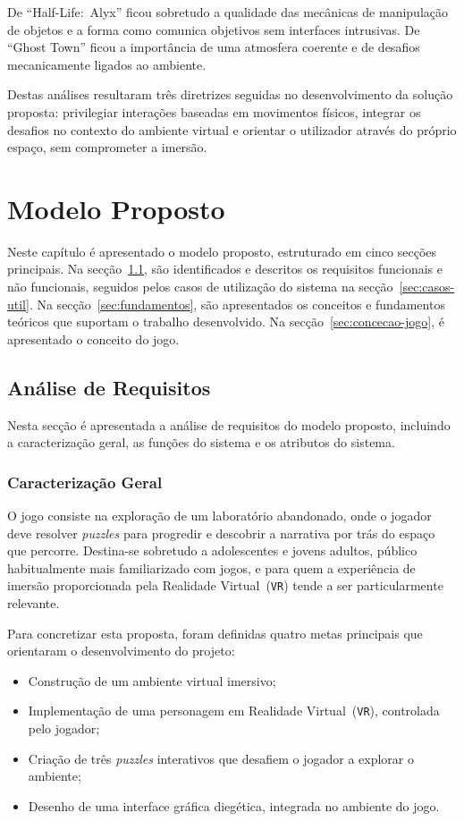 \documentclass[a4paper, 12pt]{book}
\begin{document}
De ``Half-Life:~Alyx'' ficou sobretudo a qualidade das mecânicas de manipulação 
de objetos e a forma como comunica objetivos sem interfaces intrusivas. De 
``Ghost Town'' ficou a importância de uma atmosfera coerente e de desafios 
mecanicamente ligados ao ambiente.

Destas análises resultaram três diretrizes seguidas no desenvolvimento da 
solução proposta: privilegiar interações baseadas em movimentos físicos, 
integrar os desafios no contexto do ambiente virtual e orientar o utilizador 
através do próprio espaço, sem comprometer a imersão.



\chapter{Modelo Proposto}\label{ch:modelo-proposto}

Neste capítulo é apresentado o modelo proposto, estruturado em cinco secções
principais. Na secção~\ref{sec:requisitos}, são
identificados e descritos os requisitos funcionais e não funcionais, seguidos pelos
casos de utilização do sistema na secção~\ref{sec:casos-util}. Na secção~\ref{sec:fundamentos}, 
são apresentados os conceitos e fundamentos teóricos que suportam
o trabalho desenvolvido. Na secção~\ref{sec:concecao-jogo}, 
é apresentado o conceito do jogo.

\section{Análise de Requisitos}\label{sec:requisitos}
Nesta secção é apresentada a análise de requisitos do modelo proposto, 
incluindo a caracterização geral, as funções do sistema e os atributos do sistema.
\subsection{Caracterização Geral}\label{ssec:caracterizacao-geral}
O jogo consiste na exploração de um laboratório abandonado, onde o jogador 
deve resolver \textit{puzzles} para progredir e descobrir a narrativa por trás do 
espaço que percorre. Destina-se sobretudo a adolescentes e jovens adultos, 
público habitualmente mais familiarizado com jogos, e para quem a experiência 
de imersão proporcionada pela 
Realidade Virtual~(\texttt{VR}) tende a ser particularmente relevante.

Para concretizar esta proposta, foram definidas quatro metas principais que 
orientaram o desenvolvimento do projeto:
\begin{itemize}
    \item Construção de um ambiente virtual imersivo;
    \item Implementação de uma personagem em Realidade Virtual~(\texttt{VR}), controlada 
    pelo jogador;
    \item Criação de três \textit{puzzles} interativos que desafiem o jogador a 
    explorar o ambiente;
    \item Desenho de uma interface gráfica diegética, integrada no 
    ambiente do jogo.
\end{itemize}
\end{document}
